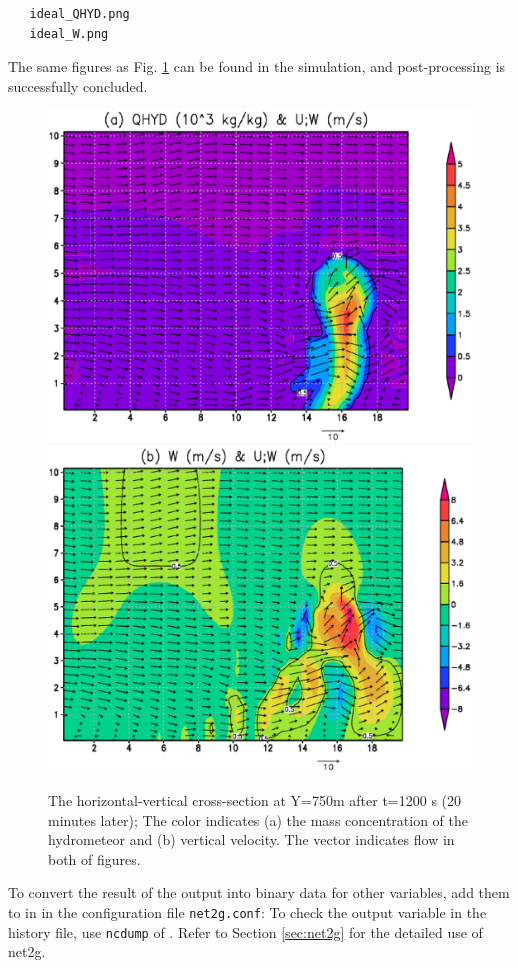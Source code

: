 \begin{verbatim}
   ideal_QHYD.png
   ideal_W.png
\end{verbatim}
The same figures as Fig. \ref{fig_ideal} can be found in the simulation,
and post-processing is successfully concluded.

\begin{figure}[t]
\begin{center}
  \includegraphics[width=0.7\hsize]{./figure/ideal_qhyd.eps}\\
  \includegraphics[width=0.7\hsize]{./figure/ideal_W.eps}\\
  \caption{The horizontal-vertical cross-section at Y=750m after t=1200 s (20 minutes later);
            The color indicates (a) the mass concentration of the hydrometeor and (b) vertical velocity. The vector indicates flow in both of figures.}
  \label{fig_ideal}
\end{center}
\end{figure}

To convert the result of the output into binary data for other variables,
add them to  in  in the configuration file \verb|net2g.conf|:
To check the output variable in the history file, use \verb|ncdump| of {\netcdf}.
Refer to Section \ref{sec:net2g} for the detailed use of net2g. 

